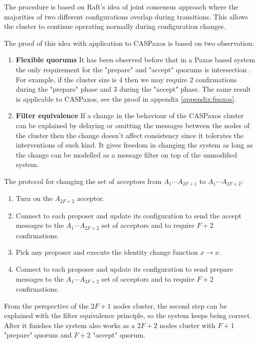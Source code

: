 \documentclass[12pt]{article}
\theoremstyle{definition}
\begin{document}
The procedure is based on Raft's idea of joint consensus\cite{raft} approach where the majorities of two different configurations overlap during transitions. This allows the cluster to continue operating normally during configuration changes.

The proof of this idea with application to CASPaxos is based on two observation:

\begin{enumerate}
  \item {\bf Flexible quorums} It has been observed before that in a Paxos based system the only requirement for the "prepare" and "accept" quorums is intersection \cite{abcds}\cite{vertical}\cite{fpaxos}. For example, if the cluster size is $4$ then we may require $2$ confirmations during the "prepare" phase and $3$ during the "accept" phase. The same result is applicable to CASPaxos, see the proof in appendix \ref{appendix:fpaxos}.
  
  \item {\bf Filter equivalence} If a change in the behaviour of the CASPaxos cluster can be explained by delaying or omitting the messages between the nodes of the cluster then the change doesn't affect consistency since it tolerates the interventions of such kind. It gives freedom in changing the system as long as the change can be modelled as a message filter on top of the unmodified system.
\end{enumerate}

The protocol for changing the set of acceptors from $A_1 \cdots A_{2F+1}$ to $A_1 \cdots A_{2F+2}$:
\begin{enumerate}
  \item Turn on the $A_{2F+2}$ acceptor.
  \item Connect to each proposer and update its configuration to send the accept messages to the $A_1 \cdots A_{2F+2}$ set of acceptors and to require $F+2$ confirmations.
  \item Pick any proposer and execute the identity change function $x \to x$.
  \item Connect to each proposer and update its configuration to send prepare messages to the $A_1 \cdots A_{2F+2}$ set of acceptors and to require $F+2$ confirmations.
\end{enumerate}

From the perspective of the $2F+1$ nodes cluster, the second step can be explained with the filter equivalence principle, so the system keeps being correct. After it finishes the system also works as a $2F+2$ nodes cluster with $F+1$ "prepare" quorum and $F+2$ "accept" quorum.
\end{document}

